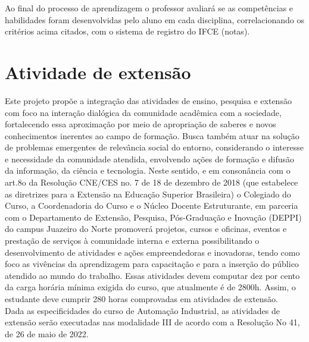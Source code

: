 Ao final do processo de aprendizagem o professor avaliará se as competências e habilidades foram desenvolvidas pelo aluno em cada disciplina, correlacionando os critérios acima citados, com o sistema de registro do IFCE (notas).\\

\chapter{Atividade de extensão}

Este projeto propõe a integração das atividades de ensino, pesquisa e extensão com foco na interação dialógica da comunidade acadêmica com a sociedade, fortalecendo essa aproximação por meio de apropriação de saberes e novos conhecimentos inerentes ao campo de formação. Busca também atuar na solução de problemas emergentes de relevância social do entorno, considerando o interesse e necessidade da comunidade atendida, envolvendo ações de formação e difusão da informação, da ciência e tecnologia. Neste sentido, e em consonância com o art.8o da Resolução CNE/CES no. 7 de 18 de dezembro de 2018 (que estabelece as diretrizes para a Extensão na Educação Superior Brasileira) o Colegiado do Curso, a Coordenadoria do Curso e o Núcleo Docente Estruturante, em parceria com o Departamento de Extensão, Pesquisa, Pós-Graduação e Inovação (DEPPI) do campus Juazeiro do Norte promoverá projetos, cursos e oficinas, eventos e prestação de serviços à comunidade interna e externa possibilitando o desenvolvimento de atividades e ações empreendedoras e inovadoras, tendo como foco as vivências da aprendizagem para capacitação e para a inserção do público atendido ao mundo do trabalho. Essas atividades devem computar dez por cento da carga horária mínima exigida do curso, que atualmente é de 2800h. Assim, o estudante deve cumprir 280 horas comprovadas em atividades de extensão.\\


Dada as especificidades do curso de Automação Industrial, as atividades de extensão serão executadas nas modalidade III de acordo com a Resolução No 41, de 26 de maio de 2022.



